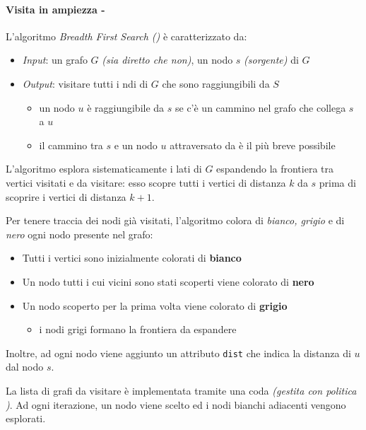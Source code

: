 \documentclass[italian, 10pt]{article}
\begin{document}
\paragraph{Visita in ampiezza - \BFS}
\label{par:grafi-bfs}

L'algoritmo \textit{Breadth First Search (\BFS)} è caratterizzato da:

\begin{itemize}
  \item \textit{Input}: un grafo \(G\) \textit{(sia diretto che non)}, un nodo \(s\) \textit{(sorgente)} di \(G\)
  \item \textit{Output}: visitare tutti i ndi di \(G\) che sono raggiungibili da \(S\)
        \begin{itemize}
          \item un nodo \(u\) è raggiungibile da \(s\) se c'è un cammino nel grafo che collega \(s\) a \(u\)
          \item il cammino tra \(s\) e un nodo \(u\) attraversato da \BFS è il più breve possibile
        \end{itemize}
\end{itemize}

L'algoritmo \BFS esplora sistematicamente i lati di \(G\) espandendo la frontiera tra vertici visitati e da visitare: esso scopre tutti i vertici di distanza \(k\) da \(s\) prima di scoprire i vertici di distanza \(k+1\).

Per tenere traccia dei nodi già visitati, l'algoritmo colora di \textit{bianco, grigio} e di \textit{nero} ogni nodo presente nel grafo:

\begin{itemize}
  \item Tutti i vertici sono inizialmente colorati di \textbf{bianco}
  \item Un nodo tutti i cui vicini sono stati scoperti viene colorato di \textbf{nero}
  \item Un nodo scoperto per la prima volta viene colorato di \textbf{grigio}
        \begin{itemize}
          \item i nodi grigi formano la frontiera da espandere
        \end{itemize}
\end{itemize}

Inoltre, ad ogni nodo viene aggiunto un attributo \texttt{dist} che indica la distanza di \(u\) dal nodo \(s\).

La lista di grafi da visitare è implementata tramite una coda \textit{(gestita con politica \FIFO)}.
Ad ogni iterazione, un nodo viene scelto ed i nodi bianchi adiacenti vengono esplorati.
\end{document}
